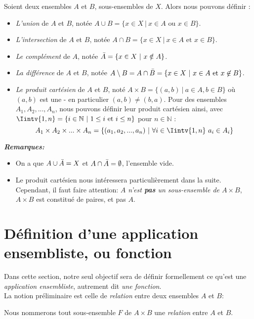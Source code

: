 \begin{boxdef}
Soient deux ensembles $A$ et $B$, sous-ensembles de $X$. Alors nous pouvons définir :
\begin{itemize}
    \item \textit{L'union} de $A$ et $B$, notée $A \cup B = \{x \in X \ | \ x \in A \text{ ou }x \in B\}$.
    \item \textit{L'intersection} de $A$ et $B$, notée $A \cap B = \{x \in X \ | \ x \in A \text{ et } x \in B\}$.
    \item \textit{Le complément} de $A$, notée $\Bar{A} = \{x \in X \ | \ x \notin A\}$.
    \item \textit{La différence} de $A$ et $B$, notée $A \setminus B = A \cap \Bar{B} = \{ x \in X \ | \ x \in A \text{ et } x \not\in B \}$.
    \item \textit{Le produit cartésien} de $A$ et $B$, noté $A \times B = \{(a,b) \ | \ a \in A, b \in B\}$ où $(a,b)$ est une  - en particulier $(a,b) \neq (b,a)$.
    Pour des ensembles $A_1, A_2,..., A_n$, nous pouvons définir leur produit cartésien ainsi, avec $\Iintv{1, n} = \{i \in \mathbb{N} \ | \ 1 \leq i \text{ et } i \leq n\}$ pour $n \in \mathbb{N}$ : $$A_1 \times A_2 \times ... \times A_n = \{(a_1, a_2, ..., a_n) \ | \ \forall i \in \Iintv{1, n}\ a_i \in A_i\}$$
\end{itemize}
\end{boxdef}

\textbf{\textit{Remarques:}}
\begin{itemize}
    \item On a que $A \cup \Bar{A} = X$ et $A \cap \Bar{A} = \emptyset$, l'ensemble vide.
    \item Le produit cartésien nous intéressera particulièrement dans la suite. Cependant, il faut faire attention: \textit{$A$ n'est \textbf{pas} un sous-ensemble de $A \times B$}, $A \times B$ est constitué de paires, et pas $A$.\\
\end{itemize}


\section{Définition d'une application ensembliste, ou fonction}
Dans cette section, notre seul objectif sera de définir formellement ce qu'est une \textit{application ensembliste}, autrement dit \textit{une fonction}. \\
La notion préliminaire est celle de \textit{relation} entre deux ensembles $A$ et $B$: 
\begin{boxdef}
Nous nommerons tout sous-ensemble $F$ de $A \times B$ une \textit{relation} entre $A$ et $B$. 
\end{boxdef}

